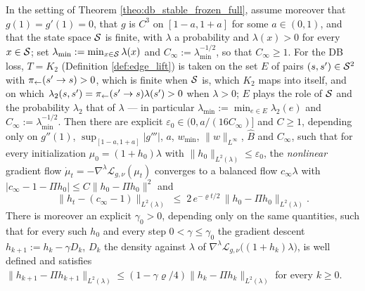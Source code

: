 \begin{theorem}\label{theo:local_convergence_full}
In the setting of Theorem \ref{theo:db_stable_frozen_full}, assume moreover that $g(1)=g'(1)=0$, that $g$ is $C^3$ on $[1-a,1+a]$ for some $a\in(0,1)$, and that the state space $\mathcal S$ is finite, with $\lambda$ a probability and $\lambda(x)>0$ for every $x\in\mathcal S$; set $\lambda_{\min}:=\min_{x\in\mathcal S}\lambda(x)$ and $C_\infty:=\lambda_{\min}^{-1/2}$, so that $C_\infty\geq1$. For the DB loss, $T=K_2$ (Definition \ref{def:edge_lift}) is taken on the set $E$ of pairs $(s,s')\in\mathcal S^2$ with $\pi_{\leftarrow}(s'\rightarrow s)>0$, which is finite when $\mathcal S$ is, which $K_2$ maps into itself, and on which $\lambda_2(s,s')=\pi_{\leftarrow}(s'\rightarrow s)\lambda(s')>0$ when $\lambda>0$; $E$ plays the role of $\mathcal S$ and the probability $\lambda_2$ that of $\lambda$ --- in particular $\lambda_{\min}:=\min_{e\in E}\lambda_2(e)$ and $C_\infty:=\lambda_{\min}^{-1/2}$. Then there are explicit $\varepsilon_0\in\bigl(0,a/(16C_\infty)\bigr]$ and $C\geq1$, depending only on $g''(1)$, $\sup_{[1-a,1+a]}|g'''|$, $a$, $w_{\min}$, $\|w\|_{L^\infty}$, $\widehat B$ and $C_\infty$, such that for every initialization $\mu_0=(1+h_0)\lambda$ with $\|h_0\|_{L^2(\lambda)}\leq\varepsilon_0$, the \emph{nonlinear} gradient flow $\dot\mu_t=-\nabla^{\lambda}\mathcal L_{g,\nu}(\mu_t)$ converges to a balanced flow $c_\infty\lambda$ with $|c_\infty-1-\Pi h_0|\leq C\|h_0-\Pi h_0\|^2$ and
\begin{equation}
    \|h_t-(c_\infty-1)\|_{L^2(\lambda)} \;\leq\; 2\,e^{-\varrho t/2}\,\|h_0-\Pi h_0\|_{L^2(\lambda)}.
\end{equation}
There is moreover an explicit $\gamma_0>0$, depending only on the same quantities, such that for every such $h_0$ and every step $0<\gamma\leq\gamma_0$ the gradient descent $h_{k+1}:=h_k-\gamma D_k$, $D_k$ the density against $\lambda$ of $\nabla^{\lambda}\mathcal L_{g,\nu}\bigl((1+h_k)\lambda\bigr)$, is well defined and satisfies $\|h_{k+1}-\Pi h_{k+1}\|_{L^2(\lambda)}\leq(1-\gamma\varrho/4)\|h_k-\Pi h_k\|_{L^2(\lambda)}$ for every $k\geq0$.
\end{theorem}

